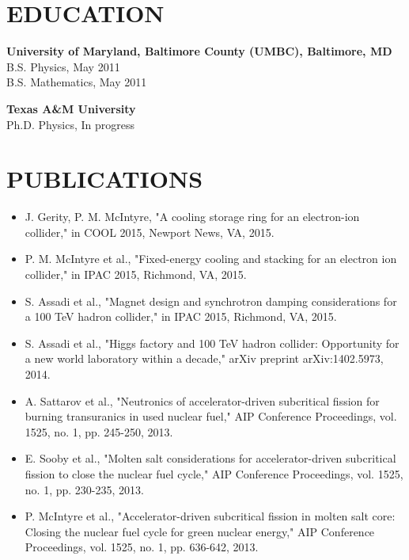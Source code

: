 \documentclass[11pt]{res} %
\begin{document}
 
 

\address{Department of Physics \& Astronomy \\
		Texas A\&M University \\
		College Station, TX 77843}
\address{}
                                             
\begin{resume}
                                               
 
\section{EDUCATION} 
\textbf{\noindent University of Maryland, Baltimore County (UMBC), Baltimore, MD} \\
B.S. Physics, May 2011 \\
B.S. Mathematics, May 2011

\textbf{\noindent Texas A\&M University} \\
Ph.D. Physics, In progress
 
\section{PUBLICATIONS} 
 
\begin{itemize}

\item 	J. Gerity, P. M. McIntyre, "A cooling storage ring for an electron-ion collider," in COOL 2015, Newport News, VA, 2015.
\item 	P. M. McIntyre et al., "Fixed-energy cooling and stacking for an electron ion collider," in IPAC 2015, Richmond, VA, 2015.
\item 	S. Assadi et al., "Magnet design and synchrotron damping considerations for a 100 TeV hadron collider," in IPAC 2015, Richmond, VA, 2015.
\item 	S. Assadi et al., "Higgs factory and 100 TeV hadron collider: Opportunity for a new world laboratory within a decade," arXiv preprint arXiv:1402.5973, 2014.
\item 	A. Sattarov et al., "Neutronics of accelerator-driven subcritical fission for burning transuranics in used nuclear fuel," AIP Conference Proceedings, vol. 1525, no. 1, pp. 245-250, 2013.
\item 	E. Sooby et al., "Molten salt considerations for accelerator-driven subcritical fission to close the nuclear fuel cycle," AIP Conference Proceedings, vol. 1525, no. 1, pp. 230-235, 2013.
\item 	P. McIntyre et al., "Accelerator-driven subcritical fission in molten salt core: Closing the nuclear fuel cycle for green nuclear energy," AIP Conference Proceedings, vol. 1525, no. 1, pp. 636-642, 2013.


\end{itemize}
\end{resume}
\end{document}
